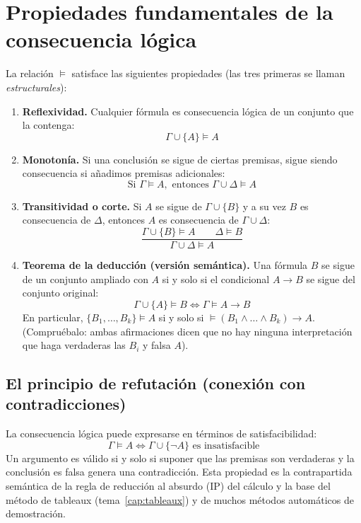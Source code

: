 
\section{Propiedades fundamentales de la consecuencia lógica}

La relación $\models$ satisface las siguientes propiedades (las tres primeras se llaman \emph{estructurales}):

\begin{enumerate}
    \item \textbf{Reflexividad.} Cualquier fórmula es consecuencia
      lógica de un conjunto que la contenga:
    \[
    \Gamma \cup \{A\} \models A
    \]
    \item \textbf{Monotonía.} Si una conclusión se sigue de ciertas premisas, sigue siendo consecuencia si añadimos premisas adicionales:
    \[
    \text{Si } \Gamma \models A, \text{ entonces } \Gamma \cup \Delta \models A
    \]
    \item \textbf{Transitividad o corte.} Si $A$ se sigue de $\Gamma \cup \{B\}$ y a su vez $B$ es consecuencia de $\Delta$, entonces $A$ es consecuencia de $\Gamma \cup \Delta$:
    \[
    \frac{\Gamma \cup \{B\} \models A \qquad \Delta \models B}{\Gamma \cup \Delta \models A}
    \]
    \item \textbf{Teorema de la deducción (versión semántica).} Una
      fórmula $B$ se sigue de un conjunto ampliado con $A$ si y solo
      si el condicional $A \to B$ se sigue del conjunto original:
    \[
    \Gamma \cup \{A\} \models B \iff \Gamma \models A \to B
    \]
    En particular, $\{B_1, \dots, B_k\} \models A$ si y solo si
    $\models (B_1 \land \dots \land B_k) \to A$. (Compruébalo: ambas
    afirmaciones dicen que no hay ninguna interpretación que haga
    verdaderas las $B_i$ y falsa $A$). 
\end{enumerate}

\subsection{El principio de refutación (conexión con contradicciones)}

La consecuencia lógica puede expresarse en términos de satisfacibilidad:
\[
\Gamma \models A \iff \Gamma \cup \{\neg A\} \text{ es insatisfacible}
\]
Un argumento es válido si y solo si suponer que las premisas son
verdaderas y la conclusión es falsa genera una contradicción. Esta
propiedad es la contrapartida semántica de la regla de reducción al
absurdo (IP) del cálculo y la base del método de tableaux (tema~\ref{cap:tableaux}) y
de muchos métodos automáticos de demostración. 

